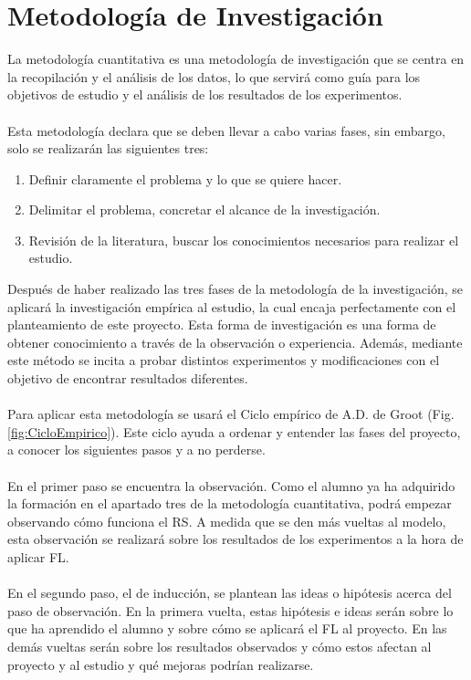\section{Metodología de Investigación}
La metodología cuantitativa es una metodología de investigación que se centra en la recopilación y el análisis de los datos, lo que servirá como guía para los objetivos de estudio y el análisis de los resultados de los experimentos. 
\\ \\
Esta metodología declara que se deben llevar a cabo varias fases, sin embargo, solo se realizarán las siguientes tres:
\begin{enumerate}
    \item Definir claramente el problema y lo que se quiere hacer. 
    \item Delimitar el problema, concretar el alcance de la investigación.
    \item Revisión de la literatura, buscar los conocimientos necesarios para realizar el estudio.
\end{enumerate}
Después de haber realizado las tres fases de la metodología de la investigación, se aplicará la investigación empírica al estudio, la cual encaja perfectamente con el planteamiento de este proyecto. Esta forma de investigación es una forma de obtener conocimiento a través de la observación o experiencia. Además, mediante este método se incita a probar distintos experimentos y modificaciones con el objetivo de encontrar resultados diferentes.
\\ \\
Para aplicar esta metodología se usará el Ciclo empírico de A.D. de Groot (Fig.\ref{fig:CicloEmpirico}). Este ciclo ayuda a ordenar y entender las fases del proyecto, a conocer los siguientes pasos y a no perderse.
\\ \\
En el primer paso se encuentra la observación. Como el alumno ya ha adquirido la formación en el apartado tres de la metodología cuantitativa, podrá empezar observando cómo funciona el RS. A medida que se den más vueltas al modelo, esta observación se realizará sobre los resultados de los experimentos a la hora de aplicar FL.
\\ \\
En el segundo paso, el de inducción, se plantean las ideas o hipótesis acerca del paso de observación. En la primera vuelta, estas hipótesis e ideas serán sobre lo que ha aprendido el alumno y sobre cómo se aplicará el FL al proyecto. En las demás vueltas serán sobre los resultados observados y cómo estos afectan al proyecto y al estudio y qué mejoras podrían realizarse. 
